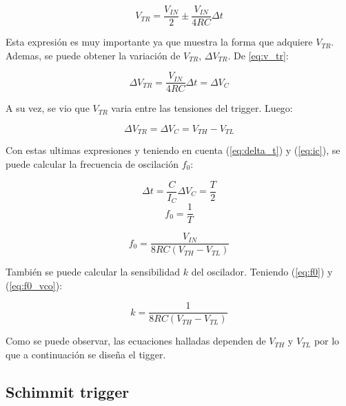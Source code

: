 \begin{equation}
     V_{TR} = \frac{V_{IN}}{2} \pm \frac{V_{IN}}{4RC} \Delta t 
    \label{eq:v_tr}
\end{equation}


Esta expresión es muy importante ya que muestra la forma que adquiere $V_{TR}$. Ademas, se puede obtener la variación de $V_{TR}$, $\Delta V_{TR}$. De \ref{eq:v_tr}:

\begin{displaymath} \Delta V_{TR} = \frac{V_{IN}}{4RC} \Delta t = \Delta V_C  \end{displaymath}

A su vez, se vio que $V_{TR}$ varia entre las tensiones del trigger. Luego:

\begin{displaymath} \Delta V_{TR} = \Delta V_{C} = V_{TH} - V_{TL} \end{displaymath}



Con estas ultimas expresiones y teniendo en cuenta (\ref{eq:delta_t}) y (\ref{eq:ic}), se puede calcular la frecuencia de oscilación $f_0$:


\begin{displaymath} \Delta t = \frac{C}{I_C} \Delta V_C = \frac{T}{2} \end{displaymath}
\begin{displaymath} f_0 = \frac{1}{T} \end{displaymath}


\begin{equation}
    f_0 = \frac{V_{IN}}{8RC (V_{TH} - V_{TL})}
    \label{eq:f0_vco}
\end{equation}

También se puede calcular la sensibilidad $k$ del oscilador. Teniendo (\ref{eq:f0}) y (\ref{eq:f0_vco}):

\begin{equation}
    k = \frac{1}{8RC(V_{TH} - V_{TL})}
    \label{eq:k}
\end{equation}

Como se puede observar, las ecuaciones halladas dependen de $V_{TH}$ y $V_{TL}$ por lo que a continuación se diseña el tigger.


\subsection{Schimmit trigger}

